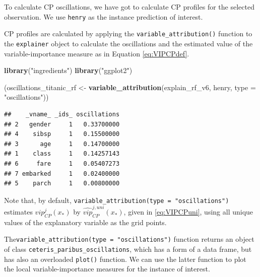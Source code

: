 \documentclass[]{krantz}
\newenvironment{Shaded}{\begin{snugshade}}{\end{snugshade}}
\newcommand{\DataTypeTok}[1]{\textcolor[rgb]{0.13,0.29,0.53}{#1}}
\newcommand{\KeywordTok}[1]{\textcolor[rgb]{0.13,0.29,0.53}{\textbf{#1}}}
\newcommand{\NormalTok}[1]{#1}
\newcommand{\OperatorTok}[1]{\textcolor[rgb]{0.81,0.36,0.00}{\textbf{#1}}}
\newcommand{\StringTok}[1]{\textcolor[rgb]{0.31,0.60,0.02}{#1}}
\begin{document}
To calculate CP oscillations, we have got to calculate CP profiles for the selected observation. We use \texttt{henry} as the instance prediction of interest.

CP profiles are calculated by applying the \texttt{variable\_attribution()} function to the \texttt{explainer} object to calculate the oscillations and the estimated value of the variable-importance measure as in Equation \eqref{eq:VIPCPdef}.

\begin{Shaded}
\begin{Highlighting}[]
\KeywordTok{library}\NormalTok{(}\StringTok{"ingredients"}\NormalTok{)}
\KeywordTok{library}\NormalTok{(}\StringTok{"ggplot2"}\NormalTok{)}

\NormalTok{(oscillations_titanic_rf <-}\StringTok{ }\KeywordTok{variable_attribution}\NormalTok{(explain_rf_v6, }
\NormalTok{                                henry, }\DataTypeTok{type =} \StringTok{"oscillations"}\NormalTok{))}
\end{Highlighting}
\end{Shaded}

\begin{verbatim}
##    _vname_ _ids_ oscillations
## 2   gender     1   0.33700000
## 4    sibsp     1   0.15500000
## 3      age     1   0.14700000
## 1    class     1   0.14257143
## 6     fare     1   0.05407273
## 7 embarked     1   0.02400000
## 5    parch     1   0.00800000
\end{verbatim}

Note that, by default, \texttt{variable\_attribution(type\ =\ "oscillations")} estimates \(vip_{CP}^j(x_*)\) by \(\widehat{vip}_{CP}^{j,uni}(x_*)\), given in \eqref{eq:VIPCPuni}, using all unique values of the explanatory variable as the grid points.

The\texttt{variable\_attribution(type\ =\ "oscillations")} function returns an object of class \texttt{ceteris\_paribus\_oscillations}, which has a form of a data frame, but has also an overloaded \texttt{plot()} function. We can use the latter function to plot the local variable-importance measures for the instance of interest.

\begin{Shaded}
\end{Shaded}
\end{document}
